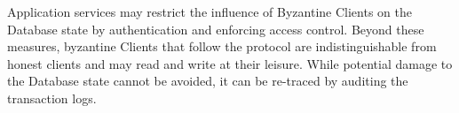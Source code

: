 Application services may restrict the influence of Byzantine Clients on the Database state by authentication and enforcing access control. Beyond these measures, byzantine Clients that follow the protocol are indistinguishable from honest clients and may read and write at their leisure. While potential damage to the Database state cannot be avoided, it can be re-traced by auditing the transaction logs.\\


